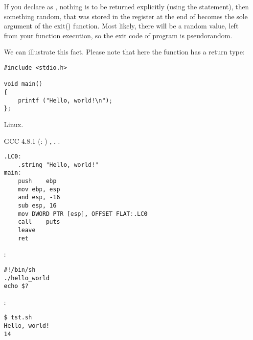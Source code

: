 \ifdefined\ENGLISH
If you declare \main as \Tvoid, nothing is to be returned explicitly (using the  statement),
then something random, that was stored in the \EAX register at the end of \main becomes 
the sole argument of the exit() function.
Most likely, there will be a random value, left from your function execution, so the exit code of program is pseudorandom.
\par
We can illustrate this fact. 
Please note that here the \main function has a \Tvoid return type:
\fi %

\begin{lstlisting}
#include <stdio.h>

void main()
{
	printf ("Hello, world!\n");
};
\end{lstlisting}

 Linux.

GCC 4.8.1  \printf {} \puts 
(: )
,  \puts {} \printf.
 \EAX {} \main{}.

\begin{lstlisting}[caption=GCC 4.8.1]
.LC0:
	.string	"Hello, world!"
main:
	push	ebp
	mov	ebp, esp
	and	esp, -16
	sub	esp, 16
	mov	DWORD PTR [esp], OFFSET FLAT:.LC0
	call	puts
	leave
	ret
\end{lstlisting}

:

\begin{lstlisting}[caption=tst.sh]
#!/bin/sh
./hello_world
echo $?
\end{lstlisting}

:

\begin{lstlisting}
$ tst.sh 
Hello, world!
14
\end{lstlisting}

